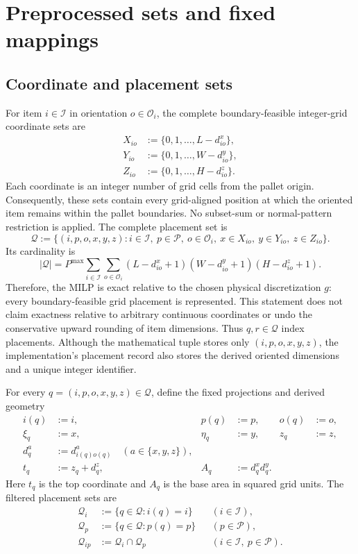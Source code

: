 \documentclass[11pt]{article}
\newcommand{\Item}{\mathcal{I}}
\newcommand{\Pallet}{\mathcal{P}}
\newcommand{\Place}{\mathcal{Q}}
\begin{document}
\section{Preprocessed sets and fixed mappings}

\subsection{Coordinate and placement sets}

For item $i\in\Item$ in orientation $o\in\mathcal O_i$, the complete
boundary-feasible integer-grid coordinate sets are
\begin{align}
  X_{io}&:=\{0,1,\ldots,L-d_{io}^x\},\\
  Y_{io}&:=\{0,1,\ldots,W-d_{io}^y\},\\
  Z_{io}&:=\{0,1,\ldots,H-d_{io}^z\}.
  \label{eq:coordinate-sets}
\end{align}
Each coordinate is an integer number of grid cells from the pallet origin.
Consequently, these sets contain every grid-aligned position at which the
oriented item remains within the pallet boundaries.  No subset-sum or
normal-pattern restriction is applied.  The complete placement set is
\begin{equation}
  \Place:=\{(i,p,o,x,y,z):i\in\Item,\ p\in\Pallet,\ o\in\mathcal O_i,
             \ x\in X_{io},\ y\in Y_{io},\ z\in Z_{io}\}.
  \label{eq:placement-set}
\end{equation}
Its cardinality is
\begin{equation}
  |\Place|=
  P^{\max}\sum_{i\in\Item}\sum_{o\in\mathcal O_i}
  (L-d_{io}^x+1)(W-d_{io}^y+1)(H-d_{io}^z+1).
  \label{eq:placement-count}
\end{equation}
Therefore, the MILP is exact relative to the chosen physical discretization
$g$: every boundary-feasible grid placement is represented.  This statement
does not claim exactness relative to arbitrary continuous coordinates or undo
the conservative upward rounding of item dimensions.
Thus $q,r\in\Place$ index placements.  Although the mathematical tuple stores
only $(i,p,o,x,y,z)$, the implementation's placement record also stores the
derived oriented dimensions and a unique integer identifier.

For every $q=(i,p,o,x,y,z)\in\Place$, define the fixed projections and derived
geometry
\begin{align}
  i(q)&:=i, & p(q)&:=p, & o(q)&:=o,\\
  \xi_q&:=x, & \eta_q&:=y, & z_q&:=z,\\
  d_q^a&:=d_{i(q)o(q)}^a\quad(a\in\{x,y,z\}),\\
  t_q&:=z_q+d_q^z, & A_q&:=d_q^xd_q^y.
  \label{eq:placement-mappings}
\end{align}
Here $t_q$ is the top coordinate and $A_q$ is the base area in squared grid
units.  The filtered placement sets are
\begin{align}
  \Place_i&:=\{q\in\Place:i(q)=i\} && (i\in\Item),\\
  \Place_p&:=\{q\in\Place:p(q)=p\} && (p\in\Pallet),\\
  \Place_{ip}&:=\Place_i\cap\Place_p && (i\in\Item,\ p\in\Pallet).
  \label{eq:filtered-placement-sets}
\end{align}
\end{document}
